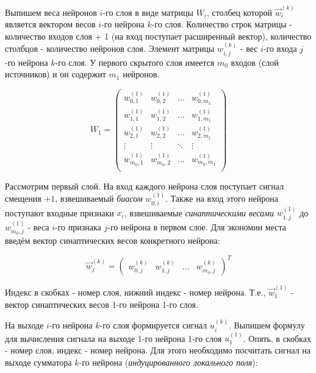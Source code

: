 \documentclass{article}
\begin{document}
Выпишем веса нейронов $i$-го слоя в виде матрицы $W_i$, столбец которой $\vec{w}_i^{(k)}$ является вектором весов $i$-го нейрона $k$-го слоя.
Количество строк матрицы - количество входов слоя + 1 (на вход поступает расширенный вектор), количество столбцов - количество нейронов слоя.
Элемент матрицы $w_{i,j}^{(k)}$ - вес $i$-го входа $j$-го нейрона $k$-го слоя.
У первого скрытого слоя имеется $m_0$ входов (слой источников) и он содержит $m_1$ нейронов.

\begin{equation}
    W_1 = 
    \begin{pmatrix}
        w_{0,1}^{(1)} & w_{0,2}^{(1)} & \dots & w_{0,{m_1}}^{(1)} \\
        w_{1,1}^{(1)} & w_{1,2}^{(1)} & \dots & w_{1,{m_1}}^{(1)} \\
        w_{2,1}^{(1)} & w_{2,2}^{(1)} & \dots & w_{2,{m_1}}^{(1)} \\
        \vdots        & \vdots        & \ddots & \vdots           \\
        w_{{m_0},1}^{(1)} & w_{{m_0},2}^{(1)} & \dots & w_{{m_0},{m_1}}^{(1)} \\
    \end{pmatrix}
\end{equation}

Рассмотрим первый слой.
На вход каждого нейрона слоя поступает сигнал смещения $+1$, взвешиваемый \textit{биасом} $w_{0,i}^{(1)}$. 
Также на вход этого нейрона поступают входные признаки $x_i$, взвешиваемые \textit{синаптическими весами} $w_{1,j}^{(1)}$ до $w_{{m_0},j}^{(1)}$ - веса $i$-го признака $j$-го нейрона в первом слое.   
Для экономии места введём вектор синаптических весов конкретного нейрона:

\begin{equation}
    \vec{w}_j^{(k)} = 
    \begin{pmatrix}
        w_{0,j}^{(k)} & w_{1,j}^{(k)} & \dots & w_{{m_0},j}^{(k)}
    \end{pmatrix}
    ^T
\end{equation}


Индекс в скобках - номер слоя, нижний индекс - номер нейрона. Т.е., $\vec{w}_1^{(1)}$ - вектор синаптических весов 1-го нейрона 1-го слоя.

На выходе $i$-го нейрона $k$-го слоя формируется сигнал $u_i^{(k)}$. 
Выпишем формулу для вычисления сигнала на выходе 1-го нейрона 1-го слоя $u_1^{(1)}$. Опять, в скобках - номер слоя, индекс - номер нейрона.
Для этого необходимо посчитать сигнал на выходе сумматора $k$-го нейрона (\textit{индуцированного локального поля}):
\end{document}
